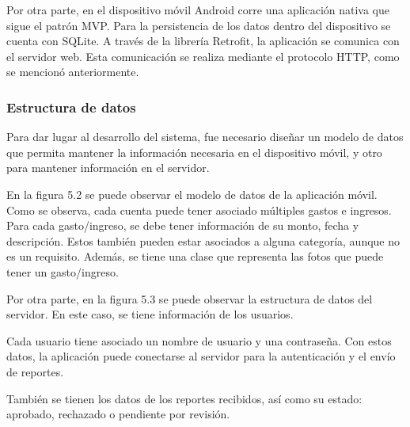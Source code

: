 Por otra parte, en el dispositivo móvil Android corre una aplicación nativa que sigue el patrón MVP. Para la persistencia de los datos dentro del dispositivo se cuenta con SQLite. A través de la librería Retrofit, la aplicación se comunica con el servidor web. Esta comunicación se realiza mediante el protocolo HTTP, como se mencionó anteriormente.

\subsubsection{Estructura de datos}

Para dar lugar al desarrollo del sistema, fue necesario diseñar un modelo de datos que permita mantener la información necesaria en el dispositivo móvil, y otro para mantener información en el servidor.

En la figura 5.2 se puede observar el modelo de datos de la aplicación móvil. Como se observa, cada cuenta puede tener asociado múltiples gastos e ingresos. Para cada gasto/ingreso, se debe tener información de su monto, fecha y descripción. Estos también pueden estar asociados a alguna categoría, aunque no es un requisito. Además, se tiene una clase que representa las fotos que puede tener un gasto/ingreso. 


Por otra parte, en la figura 5.3 se puede observar la estructura de datos del servidor. En este caso, se tiene información de los usuarios.

Cada usuario tiene asociado un nombre de usuario y una contraseña. Con estos datos, la aplicación puede conectarse al servidor para la autenticación y el envío de reportes. 

También se tienen los datos de los reportes recibidos, así como su estado: aprobado, rechazado o pendiente por revisión.

